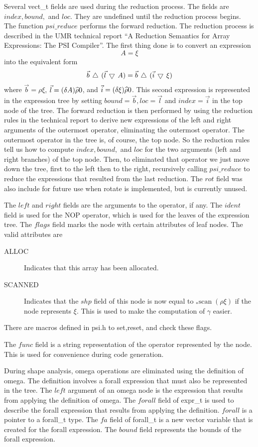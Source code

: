 Several vect\_t fields are used during the reduction process.  The fields are
$index, bound,$ and $loc$.  They are undefined until the reduction
process begins.  The function $psi\_reduce$ performs the forward reduction.
The reduction process is described in 
the UMR technical report ``A Reduction Semantics for Array 
Expressions: The PSI Compiler''.  The first thing done
is to convert an expression
$$A=\xi$$ into the equivalent form
$$\vec{b}\,\bigtriangleup\,(\vec{l}\,\bigtriangledown\, A)=\vec{b}\,\bigtriangleup\,(\vec{i}\,\bigtriangledown\, \xi)$$
where $\vec{b}=\rho\xi$, $\vec{l}=(\delta A)\widehat{\rho} 0$, and
$\vec{i}=(\delta\xi)\widehat{\rho} 0$.  This second expression is represented
in the expression tree by setting $bound=\vec{b}, loc=\vec{l}$ and
$index=\vec{i}$ in the top node of the tree.  The forward reduction is
then performed by using the reduction rules in the technical report to derive 
new expressions of the left and right arguments of the outermost operator, 
eliminating the outermost operator.  The outermost operator in the tree
is, of course, the top node.  So the reduction rules tell us how to compute
$index, bound,$ and $loc$ for the two arguments (left and right branches)
of the top node.  Then, to eliminated that operator we just move down the
tree, first to the left then to the right, recursively calling $psi\_reduce$
to reduce the expressions that resulted from the last reduction.  The
$rot$ field was also include for future use when rotate is implemented, but
is currently unused.

The $left$ and $right$ fields are the arguments to the operator, if any.
The $ident$ field is used for the NOP operator, which is used for the leaves
of the expression tree.  The $flags$ field marks the node with certain 
attributes of leaf nodes.  The valid attributes are
\begin{description}
\item[ALLOC] Indicates that this array has been allocated.
\item[SCANNED] Indicates that the $shp$ field of this node is now equal to
$_{*}\mbox{scan}\;(\rho\xi )$ if the node represents $\xi$.  This is used
to make the computation of $\gamma$ easier.
\end{description}
There are macros defined in psi.h to set,reset, and check these flags.

The $func$ field is a string representation of the operator represented
by the node.  This is used for convenience during code generation.

During shape analysis, omega operations are eliminated using the
definition of omega.  The definition involves a forall expression that
must also be represented in the tree.  The $left$ argument of an omega
node is the expression that results from applying the definition of omega.
The $forall$ field of expr\_t is used to describe the forall expression
that results from applying the definition.  $forall$ is a pointer to a
forall\_t type.  The $fa$ field of forall\_t is a new vector variable that
is created for the forall expression.  The $bound$ field represents the
bounds of the forall expression.

